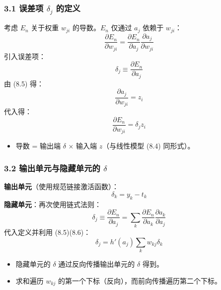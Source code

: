 \documentclass[t,aspectratio=169]{beamer} %
\begin{document}
\begin{frame}
    \frametitle{3.1 误差项 $\delta_j$ 的定义}
    考虑 $E_n$ 关于权重 $w_{ji}$ 的导数。$E_n$ 仅通过 $a_j$ 依赖于 $w_{ji}$：
    \begin{equation}
        \frac{\partial E_n}{\partial w_{ji}} = \frac{\partial E_n}{\partial a_j} \frac{\partial a_j}{\partial w_{ji}}
        \tag{8.7}
    \end{equation}
    引入\alert{误差项}：
    \begin{equation}
        \delta_j \equiv \frac{\partial E_n}{\partial a_j}
        \tag{8.8}
    \end{equation}
    由 (8.5) 得：
    \begin{equation}
        \frac{\partial a_j}{\partial w_{ji}} = z_i
        \tag{8.9}
    \end{equation}
    代入得：
    \begin{equation}
        \frac{\partial E_n}{\partial w_{ji}} = \delta_j z_i
        \tag{8.10}
    \end{equation}
    \begin{itemize}
        \item 导数 = \alert{输出端 $\delta$ × 输入端 $z$}（与线性模型 (8.4) 同形式）。
    \end{itemize}
\end{frame}

\begin{frame}
    \frametitle{3.2 输出单元与隐藏单元的 $\delta$}
    \textbf{输出单元}（使用规范链接激活函数）：
    \begin{equation}
        \delta_k = y_k - t_k
        \tag{8.11}
    \end{equation}
    \textbf{隐藏单元}：再次使用链式法则：
    \begin{equation}
        \delta_j \equiv \frac{\partial E_n}{\partial a_j} = \sum_k \frac{\partial E_n}{\partial a_k} \frac{\partial a_k}{\partial a_j}
        \tag{8.12}
    \end{equation}
    代入定义并利用 (8.5)(8.6)：
    \begin{equation}
        \delta_j = h'(a_j) \sum_k w_{kj} \delta_k
        \tag{8.13}
    \end{equation}
    \begin{itemize}
        \item 隐藏单元的 $\delta$ 通过\alert{反向传播}输出单元的 $\delta$ 得到。
        \item 求和遍历 $w_{kj}$ 的\alert{第一个下标}（反向），而前向传播遍历第二个下标。
    \end{itemize}
\end{frame}
\end{document}
